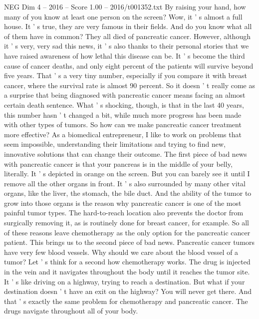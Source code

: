 \begin{textsample}{NEG Dim 4 – 2016 – Score 1.00 – 2016/t001352.txt}  \label{ex:f4_neg_044}
By raising your hand, how many of you know at least one person on the screen?
Wow, it ' s almost a full house.
It ' s true, they are very famous in their fields.
And do you know what all of them have in common?
They all died of pancreatic cancer.
However, although it ' s very, very sad this news, it ' s also thanks to their personal stories that we have raised awareness of how lethal this disease can be.
It ' s become the third cause of cancer deaths, and only eight percent of the patients will survive beyond five years.
That ' s a very tiny number, especially if you compare it with breast cancer, where the survival rate is almost 90 percent.
So it doesn ' t really come as a surprise that being diagnosed with pancreatic cancer means facing an almost certain death sentence.
What ' s shocking, though, is that in the last 40 years, this number hasn ' t changed a bit, while much more progress has been made with other types of tumors.
So how can we make pancreatic cancer treatment more effective?
As a biomedical entrepreneur, I like to work on problems that seem impossible, understanding their limitations and trying to find new, innovative solutions that can change their outcome.
The first piece of bad news with pancreatic cancer is that your pancreas is in the middle of your belly, literally.
It ' s depicted in orange on the screen.
But you can barely see it until I remove all the other organs in front.
It ' s also surrounded by many other vital organs, like the liver, the stomach, the bile duct.
And the ability of the tumor to grow into those organs is the reason why pancreatic cancer is one of the most painful tumor types.
The hard-to-reach location also prevents the doctor from surgically removing it, as is routinely done for breast cancer, for example.
So all of these reasons leave chemotherapy as the only option for the pancreatic cancer patient.
This brings us to the second piece of bad news.
Pancreatic cancer tumors have very few blood vessels.
Why should we care about the blood vessel of a tumor?
Let ' s think for a second how chemotherapy works.
The drug is injected in the vein and it navigates throughout the body until it reaches the tumor site.
It ' s like driving on a highway, trying to reach a destination.
But what if your destination doesn ' t have an exit on the highway?
You will never get there.
And that ' s exactly the same problem for chemotherapy and pancreatic cancer.
The drugs navigate throughout all of your body.

\end{textsample}
